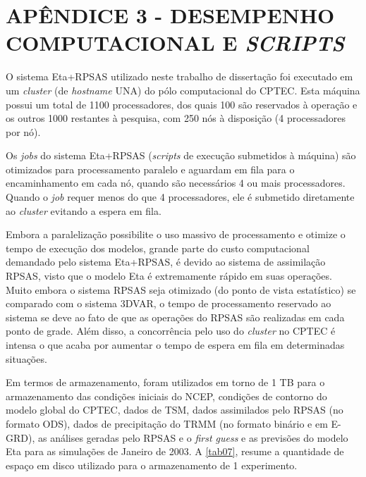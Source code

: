 \hypertarget{estilo:apendice3}{}

\chapter{APÊNDICE 3 - DESEMPENHO COMPUTACIONAL E \textit{SCRIPTS}}
\label{apendice3}

O sistema Eta+RPSAS utilizado neste trabalho de dissertação foi executado em um \textit{cluster} (de \textit{hostname} UNA) do pólo computacional do CPTEC. Esta máquina possui um total de 1100 processadores, dos quais 100 são reservados à operação e os outros 1000 restantes à pesquisa, com 250 nós à disposição (4 processadores por nó).

Os \textit{jobs} do sistema Eta+RPSAS (\textit{scripts} de execução submetidos à máquina) são otimizados para processamento paralelo e aguardam em fila para o encaminhamento em cada nó, quando são necessários 4 ou mais processadores. Quando o \textit{job} requer menos do que 4 processadores, ele é submetido diretamente ao \textit{cluster} evitando a espera em fila.

Embora a paralelização possibilite o uso massivo de processamento e otimize o tempo de execução dos modelos, grande parte do custo computacional demandado pelo sistema Eta+RPSAS, é devido ao sistema de assimilação RPSAS, visto que o modelo Eta é extremamente rápido em suas operações. Muito embora o sistema RPSAS seja otimizado (do ponto de vista estatístico) se comparado com o sistema 3DVAR, o tempo de processamento reservado ao sistema se deve ao fato de que as operações do RPSAS são realizadas em cada ponto de grade. Além disso, a concorrência pelo uso do \textit{cluster} no CPTEC é intensa o que acaba por aumentar o tempo de espera em fila em determinadas situações.

Em termos de armazenamento, foram utilizados em torno de 1 TB para o armazenamento das condições iniciais do NCEP, condições de contorno do modelo global do CPTEC, dados de TSM, dados assimilados pelo RPSAS (no formato ODS), dados de precipitação do TRMM (no formato binário e em E-GRD), as análises geradas pelo RPSAS e o \textit{first guess} e as previsões do modelo Eta para as simulações de Janeiro de 2003. A \autoref{tab07}, resume a quantidade de espaço em disco utilizado para o armazenamento de 1 experimento.

\break

